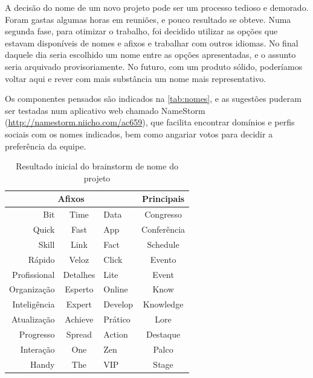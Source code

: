 \documentclass[12pt,a4paper,twoside,hyphens,english,brazil]{abntex2}
\begin{document}
A decisão do nome de um novo projeto pode ser um processo tedioso e demorado. Foram gastas algumas horas em reuniões, e pouco resultado se obteve. Numa segunda fase, para otimizar o trabalho, foi decidido utilizar as opções que estavam disponíveis de nomes e afixos e trabalhar com outros idiomas. No final daquele dia seria escolhido um nome entre as opções apresentadas, e o assunto seria arquivado provisoriamente. No futuro, com um produto sólido, poderíamos voltar aqui e rever com mais substância um nome mais representativo.

Os componentes pensados são indicados na \autoref{tab:nomes}, e as sugestões puderam ser testadas num aplicativo web chamado NameStorm (\url{http://namestorm.niicho.com/ac659}), que facilita encontrar domínios e perfis sociais com os nomes indicados, bem como angariar votos para decidir a preferência da equipe.\\

\begin{table}[h]
	\caption{Resultado inicial do brainstorm de nome do projeto}
	\centering
	\begin{tabular}{rcl|c}
		\multicolumn{3}{c|}{\textbf{Afixos}}& \textbf{Principais} \\\hline
		Bit			& Time		& Data		& Congresso		 \\\cline{1-3}
		Quick		& Fast		& App		& Conferência	 \\\cline{1-3}
		Skill		& Link		& Fact		& Schedule		 \\\cline{1-3}
		Rápido		& Veloz		& Click 	& Evento		 \\\cline{1-3}
		Profissional& Detalhes	& Lite		& Event			 \\\cline{1-3}
		Organização	& Esperto	& Online	& Know			 \\\cline{1-3}
		Inteligência& Expert	& Develop	& Knowledge		 \\\cline{1-3}
		Atualização	& Achieve	& Prático	& Lore			 \\\cline{1-3}
		Progresso	& Spread	& Action	& Destaque		 \\\cline{1-3}
		Interação	& One		& Zen		& Palco			 \\\cline{1-3}
		Handy		& The		& VIP		& Stage			
	\end{tabular}
	\label{tab:nomes}
\end{table}
\end{document}
